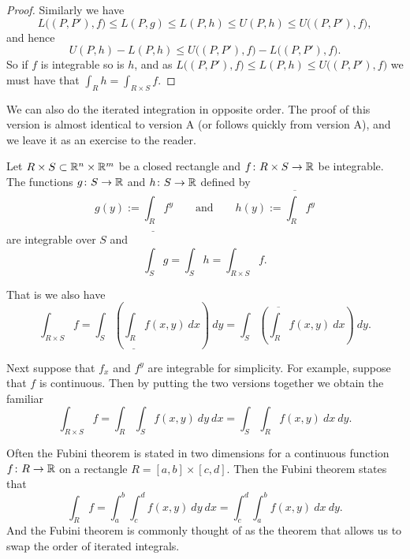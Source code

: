 \begin{proof}
Similarly we have
\begin{equation*}
L\bigl((P,P'),f\bigr)
\leq
L(P,g) \leq
L(P,h) \leq
U(P,h) \leq
U\bigl((P,P'),f\bigr) ,
\end{equation*}
and hence
\begin{equation*}
U(P,h) - L(P,h)
\leq
U\bigl((P,P'),f\bigr) -
L\bigl((P,P'),f\bigr) .
\end{equation*}
So if $f$ is integrable so is $h$, and
as $L\bigl((P,P'),f\bigr) \leq L(P,h) \leq U\bigl((P,P'),f\bigr)$ we must have
that $\int_R h = \int_{R \times S} f$.
\end{proof}

We can also do the iterated integration in opposite order.
The proof of this version is almost identical to version A
(or follows quickly from version A), and
we leave it as an exercise to the reader.

\begin{thm}\label{mv:fubinivB}
Let $R \times S \subset {\mathbb{R}}^n \times {\mathbb{R}}^m$ be a closed rectangle and
$f \colon R \times S \to {\mathbb{R}}$ be integrable.
The functions $g \colon S \to {\mathbb{R}}$ and $h \colon S \to {\mathbb{R}}$ defined by
\begin{equation*}
g(y) := \underline{\int_R} f^y \qquad
\text{and} \qquad
h(y) := \overline{\int_R} f^y 
\end{equation*}
are integrable over $S$ and
\begin{equation*}
\int_S g = \int_S h = \int_{R \times S} f .
\end{equation*}
\end{thm}

That is we also have
\begin{equation*}
\int_{R \times S} f
=
 \int_S \left(
 \underline{\int_R} f(x,y) ~ dx
\right) ~ dy
=
 \int_S \left(
 \overline{\int_R} f(x,y) ~ dx
\right) ~ dy .
\end{equation*}

Next suppose that $f_x$ and $f^y$ are integrable for simplicity.
For example, suppose that $f$ is continuous.  Then by
putting the two versions together we obtain the familiar
\begin{equation*}
\int_{R \times S} f
=
 \int_R 
 \int_S f(x,y) ~ dy ~ dx 
=
 \int_S 
 \int_R f(x,y) ~ dx ~ dy .
\end{equation*}

Often the Fubini theorem is stated in two dimensions
for a continuous function $f \colon R \to
{\mathbb{R}}$ on a rectangle $R = [a,b] \times [c,d]$.  Then the Fubini theorem
states that
\begin{equation*}
\int_R f = \int_a^b \int_c^d f(x,y) ~dy~dx
=
\int_c^d \int_a^b f(x,y) ~dx~dy .
\end{equation*}
And the Fubini theorem is commonly thought of as the theorem that allows us
to swap the order of iterated integrals.


